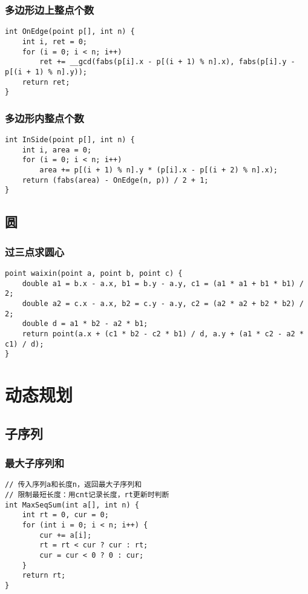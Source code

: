 \documentclass[a4paper]{article}
\begin{document}
\subsubsection{多边形边上整点个数}
\begin{lstlisting}
int OnEdge(point p[], int n) {
	int i, ret = 0;
	for (i = 0; i < n; i++)
		ret += __gcd(fabs(p[i].x - p[(i + 1) % n].x), fabs(p[i].y - p[(i + 1) % n].y));
	return ret;
}
\end{lstlisting}
\subsubsection{多边形内整点个数}
\begin{lstlisting}
int InSide(point p[], int n) {
	int i, area = 0;
	for (i = 0; i < n; i++) 
		area += p[(i + 1) % n].y * (p[i].x - p[(i + 2) % n].x);	
	return (fabs(area) - OnEdge(n, p)) / 2 + 1;
}
\end{lstlisting}
\subsection{圆}
\subsubsection{过三点求圆心}
\begin{lstlisting}
point waixin(point a, point b, point c) {
	double a1 = b.x - a.x, b1 = b.y - a.y, c1 = (a1 * a1 + b1 * b1) / 2;
	double a2 = c.x - a.x, b2 = c.y - a.y, c2 = (a2 * a2 + b2 * b2) / 2;
	double d = a1 * b2 - a2 * b1;
	return point(a.x + (c1 * b2 - c2 * b1) / d, a.y + (a1 * c2 - a2 * c1) / d);
}
\end{lstlisting}
\clearpage
\section{动态规划}
\subsection{子序列}
\subsubsection{最大子序列和}
\begin{lstlisting}
// 传入序列a和长度n，返回最大子序列和
// 限制最短长度：用cnt记录长度，rt更新时判断
int MaxSeqSum(int a[], int n) {
	int rt = 0, cur = 0;
	for (int i = 0; i < n; i++) {
		cur += a[i];
		rt = rt < cur ? cur : rt;
		cur = cur < 0 ? 0 : cur;
	}
	return rt;
}
\end{lstlisting}
\end{document}

